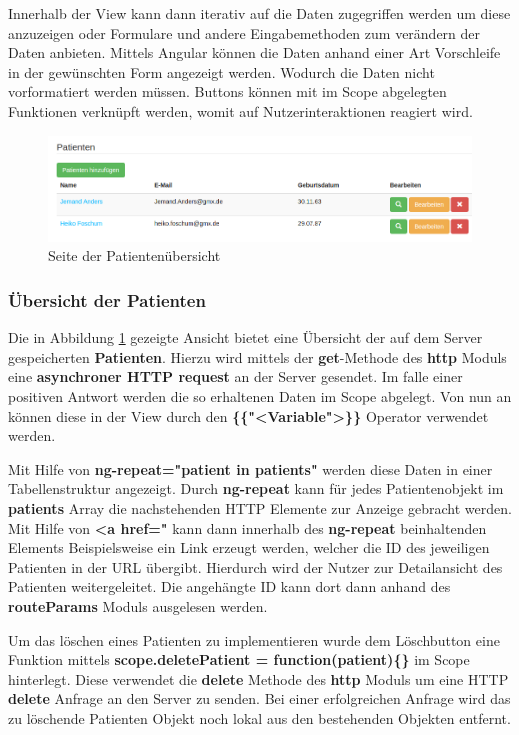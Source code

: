 Innerhalb der View kann dann iterativ auf die Daten zugegriffen werden um diese anzuzeigen oder Formulare und andere Eingabemethoden zum verändern der Daten anbieten.
Mittels Angular können die Daten anhand einer Art Vorschleife in der gewünschten Form angezeigt werden. Wodurch die Daten nicht vorformatiert werden müssen.
Buttons können mit im Scope abgelegten Funktionen verknüpft werden, womit auf Nutzerinteraktionen reagiert wird.
\begin{figure}[H]
	\centering
	\includegraphics[scale=0.4]{images/Screenshots/PatientenUebersicht}
	\caption[Seite der Patientenübersicht]{Seite der Patientenübersicht}
	\label{PatientenUebersicht}
\end{figure}

\subsubsection{Übersicht der Patienten}
Die in Abbildung \ref{PatientenUebersicht} gezeigte Ansicht bietet eine Übersicht der auf dem Server gespeicherten \textbf{Patienten}. Hierzu wird mittels der \textbf{get}-Methode des \textbf{http} Moduls eine \textbf{asynchroner HTTP request} an der Server gesendet. Im falle einer positiven Antwort werden die so erhaltenen Daten im Scope abgelegt. Von nun an können diese in der View durch den \textbf{\{\{"<Variable">\}\}} Operator verwendet werden.

Mit Hilfe von \textbf{ng-repeat="patient in patients"} werden diese Daten in einer Tabellenstruktur angezeigt. Durch \textbf{ng-repeat} kann für jedes Patientenobjekt im \textbf{patients} Array die nachstehenden HTTP Elemente zur Anzeige gebracht werden. Mit Hilfe von \textbf{<a href=" } kann dann innerhalb des \textbf{ng-repeat} beinhaltenden Elements Beispielsweise ein Link erzeugt werden, welcher die ID des jeweiligen Patienten in der URL übergibt. Hierdurch wird der Nutzer zur Detailansicht des Patienten weitergeleitet. Die angehängte ID kann dort dann anhand des \textbf{routeParams} Moduls ausgelesen werden. 

Um das löschen eines Patienten zu implementieren wurde dem Löschbutton eine Funktion mittels \textbf{scope.deletePatient = function(patient)\{\}} im Scope hinterlegt. Diese verwendet die \textbf{delete} Methode des \textbf{http} Moduls um eine HTTP \textbf{delete} Anfrage an den Server zu senden. Bei einer erfolgreichen Anfrage wird das zu löschende Patienten Objekt noch lokal aus den bestehenden Objekten entfernt.

